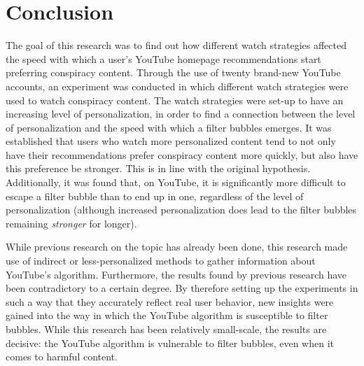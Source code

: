 \documentclass[../main.tex]{subfiles}
\begin{document}
\section{Conclusion}
The goal of this research was to find out how different watch strategies affected the speed with which a user's YouTube 
homepage recommendations start preferring conspiracy content. Through the use of twenty brand-new YouTube accounts, an 
experiment was conducted in which different watch strategies were used to watch conspiracy content. The watch strategies
were set-up to have an increasing level of personalization, in order to find a connection between the level of
personalization and the speed with which a filter bubbles emerges. It was established that users who watch more
personalized content tend to not only have their recommendations prefer conspiracy content more quickly, but also have
this preference be stronger. This is in line with the original hypothesis. Additionally, it was found that, on YouTube, it
is significantly more difficult to escape a filter bubble than to end up in one, regardless of the level of
personalization (although increased personalization does lead to the filter bubbles remaining \textit{stronger} for
longer).

While previous research on the topic has already been done, this research made use of indirect or less-personalized
methods to gather information about YouTube's algorithm. Furthermore, the results found by previous research have been
contradictory to a certain degree. By therefore setting up the experiments in such a way that they accurately reflect real
user behavior, new insights were gained into the way in which the YouTube algorithm is susceptible to filter bubbles.
While this research has been relatively small-scale, the results are decisive: the YouTube algorithm is vulnerable to filter bubbles, even when it comes to harmful content.  
\end{document}
